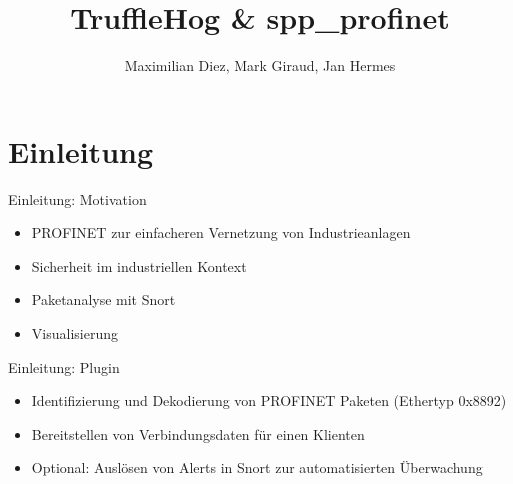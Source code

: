 \documentclass[18pt]{beamer}
\title[TruffleHog \& spp\_profinet]{TruffleHog \& spp\_profinet}
\author{Maximilian Diez, Mark Giraud, Jan Hermes}
\institute{Fraunhofer IOSB}
\begin{document}

\begin{frame}
\titlepage
\end{frame}


\section{Einleitung}
\begin{frame}{Einleitung: Motivation}
    \begin{itemize}
      \item PROFINET zur einfacheren Vernetzung von Industrieanlagen
      \pause
      \item Sicherheit im industriellen Kontext
      \pause
      \item Paketanalyse mit Snort
      \pause
      \item Visualisierung
    \end{itemize}
\end{frame}

\begin{frame}{Einleitung: Plugin}
    \begin{itemize}
      \item Identifizierung und Dekodierung von PROFINET Paketen (Ethertyp 0x8892)
      \pause
      \item Bereitstellen von Verbindungsdaten für einen Klienten
      \pause
      \item Optional: Auslösen von Alerts in Snort zur automatisierten Überwachung
    \end{itemize}
\end{frame}
\end{document}
